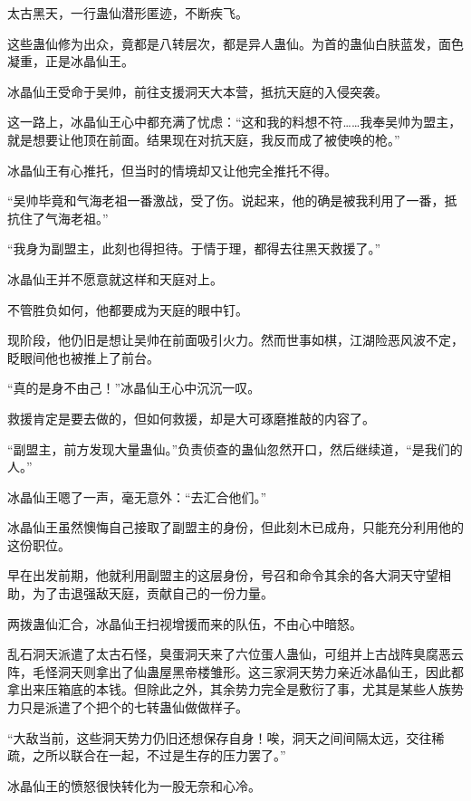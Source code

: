 
\begin{this_body}

太古黑天，一行蛊仙潜形匿迹，不断疾飞。

这些蛊仙修为出众，竟都是八转层次，都是异人蛊仙。为首的蛊仙白肤蓝发，面色凝重，正是冰晶仙王。

冰晶仙王受命于吴帅，前往支援洞天大本营，抵抗天庭的入侵突袭。

这一路上，冰晶仙王心中都充满了忧虑：“这和我的料想不符……我奉吴帅为盟主，就是想要让他顶在前面。结果现在对抗天庭，我反而成了被使唤的枪。”

冰晶仙王有心推托，但当时的情境却又让他完全推托不得。

“吴帅毕竟和气海老祖一番激战，受了伤。说起来，他的确是被我利用了一番，抵抗住了气海老祖。”

“我身为副盟主，此刻也得担待。于情于理，都得去往黑天救援了。”

冰晶仙王并不愿意就这样和天庭对上。

不管胜负如何，他都要成为天庭的眼中钉。

现阶段，他仍旧是想让吴帅在前面吸引火力。然而世事如棋，江湖险恶风波不定，眨眼间他也被推上了前台。

“真的是身不由己！”冰晶仙王心中沉沉一叹。

救援肯定是要去做的，但如何救援，却是大可琢磨推敲的内容了。

“副盟主，前方发现大量蛊仙。”负责侦查的蛊仙忽然开口，然后继续道，“是我们的人。”

冰晶仙王嗯了一声，毫无意外：“去汇合他们。”

冰晶仙王虽然懊悔自己接取了副盟主的身份，但此刻木已成舟，只能充分利用他的这份职位。

早在出发前期，他就利用副盟主的这层身份，号召和命令其余的各大洞天守望相助，为了击退强敌天庭，贡献自己的一份力量。

两拨蛊仙汇合，冰晶仙王扫视增援而来的队伍，不由心中暗怒。

乱石洞天派遣了太古石怪，臭蛋洞天来了六位蛋人蛊仙，可组并上古战阵臭腐恶云阵，毛怪洞天则拿出了仙蛊屋黑帝楼雏形。这三家洞天势力亲近冰晶仙王，因此都拿出来压箱底的本钱。但除此之外，其余势力完全是敷衍了事，尤其是某些人族势力只是派遣了个把个的七转蛊仙做做样子。

“大敌当前，这些洞天势力仍旧还想保存自身！唉，洞天之间间隔太远，交往稀疏，之所以联合在一起，不过是生存的压力罢了。”

冰晶仙王的愤怒很快转化为一股无奈和心冷。


\end{this_body}

